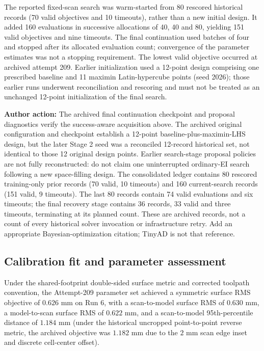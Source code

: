 \documentclass[11pt]{article}
\newcommand{\pending}[1]{\par\noindent\textbf{Author action:} #1\par}
\begin{document}
The reported fixed-scan search was warm-started from 80 rescored historical records (70 valid objectives and 10 timeouts), rather than a new initial design. It added 160 evaluations in successive allocations of 40, 40 and 80, yielding 151 valid objectives and nine timeouts. The final continuation used batches of four and stopped after its allocated evaluation count; convergence of the parameter estimates was not a stopping requirement. The lowest valid objective occurred at archived attempt 209. Earlier initialization used a 12-point design comprising one prescribed baseline and 11 maximin Latin-hypercube points (seed 2026); those earlier runs underwent reconciliation and rescoring and must not be treated as an unchanged 12-point initialization of the final search.
\pending{The archived final continuation checkpoint and proposal diagnostics verify the success-aware acquisition above. The archived original configuration and checkpoint establish a 12-point baseline-plus-maximin-LHS design, but the later Stage 2 seed was a reconciled 12-record historical set, not identical to those 12 original design points. Earlier search-stage proposal policies are not fully reconstructed: do not claim one uninterrupted ordinary-EI search following a new space-filling design. The consolidated ledger contains 80 rescored training-only prior records (70 valid, 10 timeouts) and 160 current-search records (151 valid, 9 timeouts). The last 80 records contain 74 valid evaluations and six timeouts; the final recovery stage contains 36 records, 33 valid and three timeouts, terminating at its planned count. These are archived records, not a count of every historical solver invocation or infrastructure retry. Add an appropriate Bayesian-optimization citation; TinyAD is not that reference.}

\subsection{Calibration fit and parameter assessment}
Under the shared-footprint double-sided surface metric and corrected toolpath convention, the Attempt-209 parameter set achieved a symmetric surface RMS objective of $0.626$ mm on Run 6, with a scan-to-model surface RMS of $0.630$ mm, a model-to-scan surface RMS of $0.622$ mm, and a scan-to-model 95th-percentile distance of $1.184$ mm (under the historical uncropped point-to-point reverse metric, the archived objective was $1.182$ mm due to the $2\text{ mm}$ scan edge inset and discrete cell-center offset).
\end{document}
